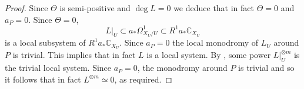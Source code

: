 \documentclass[12pt]{amsart}
\begin{document}
\begin{proof}
Since $\Theta$ is semi-positive and $\deg L = 0$ we deduce that in fact $\Theta = 0$ and $a_P = 0$.
Since $\Theta = 0$, 
\[L|_{U} \subset a_*\Omega^1_{X_U/U} \subset R^1a_*\mathbb C_{X_U}\] is a local subsystem of $R^1a_*\mathbb C_{X_U}$.
Since $a_P = 0$ the local monodromy of $L_U$ around $P$ is trivial.  This implies that in fact $L$ is a local system. 
By \cite[Corollaire 4.2.8.iii.b]{MR498552}, some power $L|_U^{\otimes m}$ is the trivial local system.   Since $a_P = 0$, the monodromy around $P$ is trivial and so it follows that in fact $L^{\otimes m}\simeq 0$, as required.
\iffalse








\end{proof}
\end{document}
